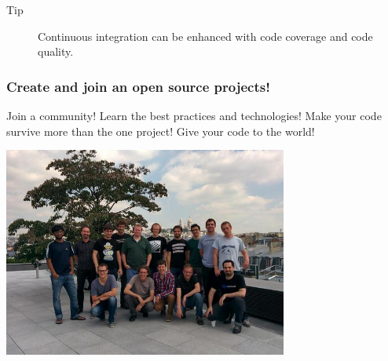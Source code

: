 \documentclass[11pt,compress,serif]{beamer}
\begin{document}
\begin{frame}
{         \begin{description}    
             \item[Tip] Continuous integration can be enhanced with code coverage and code quality. 
         \end{description}          
       
    }


\end{frame}

\begin{frame}[fragile=singleslide]
\frametitle{Create and join an open source projects!}

Join a community! Learn the best practices and technologies! 
Make your code survive more than the one project! Give your
code to the world!

\begin{center}
\includegraphics[width=0.7\textwidth]{scikit-learn-sprint.jpg}

\begin{small}
\end{small}
\end{center}

    
\end{frame}
\end{document}
